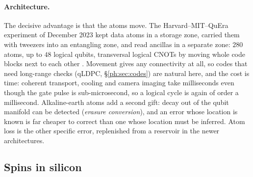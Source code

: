 \paragraph{Architecture.} The decisive advantage is that the atoms move. The Harvard--MIT--QuEra
experiment of December 2023 kept data atoms in a storage zone, carried them with tweezers into an
entangling zone, and read ancillas in a separate zone: $280$ atoms, up to $48$ logical qubits,
transversal logical CNOTs by moving whole code blocks next to each other
\cite{ph:bluvstein23}. Movement gives any connectivity at all, so codes that need long-range
checks (qLDPC, \S\ref{ph:sec:codes}) are natural here, and the cost is time: coherent transport,
cooling and camera imaging take milliseconds even though the gate pulse is sub-microsecond, so a
logical cycle is again of order a millisecond. Alkaline-earth atoms add a second gift: decay out of
the qubit manifold can be detected (\emph{erasure conversion}), and an error whose location is
known is far cheaper to correct than one whose location must be inferred. Atom loss is the other
specific error, replenished from a reservoir in the newer architectures.

\subsection{Spins in silicon}\label{ph:sec:spins}

